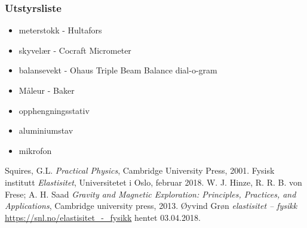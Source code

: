 \documentclass[%
 reprint,
 amsmath,amssymb,
 aps,
 norsk,
 booktabs
]{revtex4-1}
\begin{document}
\subsubsection*{Utstyrsliste}
\begin{itemize}
\label{utstyr}
\item meterstokk - Hultafors
\item skyvelær - Cocraft Micrometer
\item balansevekt - Ohaus Triple Beam Balance dial-o-gram
\item Måleur - Baker
\item opphengningsstativ
\item aluminiumstav
\item mikrofon
\end{itemize}
\begin{thebibliography}{9}
Squires, G.L. \emph{Practical Physics}, Cambridge University Press, 2001.
Fysisk institutt \emph{Elastisitet}, Universitetet i Oslo, februar 2018.
W. J. Hinze, R. R. B. von Frese; A. H. Saad \emph{Gravity and Magnetic Exploration: Principles, Practices, and Applications}, Cambridge university press, 2013.
Øyvind Grøn \emph{elastisitet – fysikk} \url{https://snl.no/elastisitet_-_fysikk} hentet 03.04.2018.
\end{thebibliography}
\end{document}
